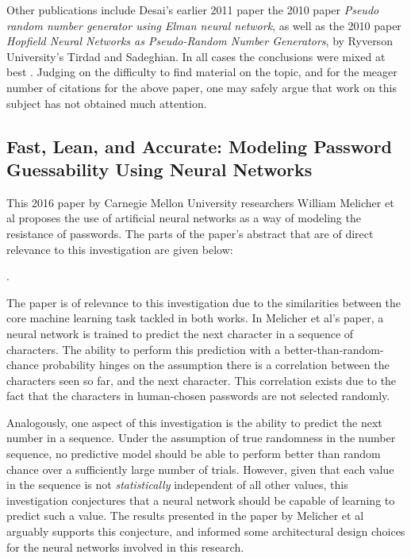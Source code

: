 \documentclass[12pt, titlepage]{report}
\theoremstyle{definition}
\begin{document}
Other publications include Desai's earlier 2011 paper  the 2010 paper \textit{Pseudo random number generator using Elman neural network}, as well as the 2010 paper \textit{Hopfield Neural Networks as Pseudo-Random Number Generators}, by Ryverson University's Tirdad and Sadeghian. In all cases the conclusions were mixed at best \cite{desai2011pseudo} \cite{tirdad2010hopfield}. Judging on the difficulty to find material on the topic, and for the meager number of citations for the above paper, one may safely argue that work on this subject has not obtained much attention.



\subsection{Fast, Lean, and Accurate: Modeling Password Guessability Using Neural Networks}
This 2016 paper by Carnegie Mellon University researchers William Melicher et al proposes the use of artificial neural networks as a way of modeling the resistance of passwords. The parts of the paper's abstract that are of direct relevance to this investigation are given below:

 \cite{melicher2016fast}.

The paper is of relevance to this investigation due to the similarities between the core machine learning task tackled in both works. In Melicher et al's paper, a neural network is trained to predict the next character in a sequence of characters. The ability to perform this prediction with a better-than-random-chance probability hinges on the assumption there is a correlation between the characters seen so far, and the next character. This correlation exists due to the fact that the characters in human-chosen passwords are not selected randomly.

Analogously, one aspect of this investigation is the ability to predict the next number in a sequence. Under the assumption of true randomness in the number sequence, no predictive model should be able to perform better than random chance over a sufficiently large number of trials. However, given that each value in the sequence is not \textit{statistically} independent of all other values, this investigation conjectures that a neural network should be capable of learning to predict such a value. The results presented in the paper by Melicher et al arguably supports this conjecture, and informed some architectural design choices for the neural networks involved in this research.
\end{document}
